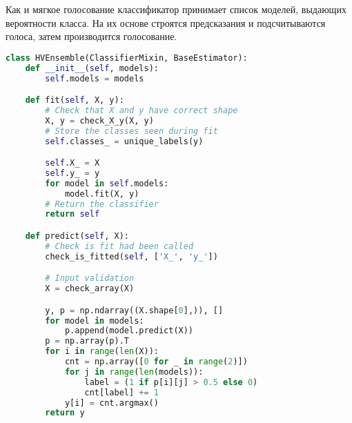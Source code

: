 Как и мягкое голосование классификатор принимает список моделей, выдающих вероятности класса. На их основе строятся предсказания и подсчитываются голоса, затем производится голосование.
\begin{lstlisting}[language=Python]
class HVEnsemble(ClassifierMixin, BaseEstimator):
    def __init__(self, models):
        self.models = models

    def fit(self, X, y):
        # Check that X and y have correct shape
        X, y = check_X_y(X, y)
        # Store the classes seen during fit
        self.classes_ = unique_labels(y)

        self.X_ = X
        self.y_ = y
        for model in self.models:
            model.fit(X, y)
        # Return the classifier
        return self

    def predict(self, X):
        # Check is fit had been called
        check_is_fitted(self, ['X_', 'y_'])

        # Input validation
        X = check_array(X)

        y, p = np.ndarray((X.shape[0],)), []
        for model in models:
            p.append(model.predict(X))
        p = np.array(p).T
        for i in range(len(X)):
            cnt = np.array([0 for _ in range(2)])
            for j in range(len(models)):
                label = (1 if p[i][j] > 0.5 else 0)
                cnt[label] += 1
            y[i] = cnt.argmax()
        return y
\end{lstlisting}
\pagebreak
